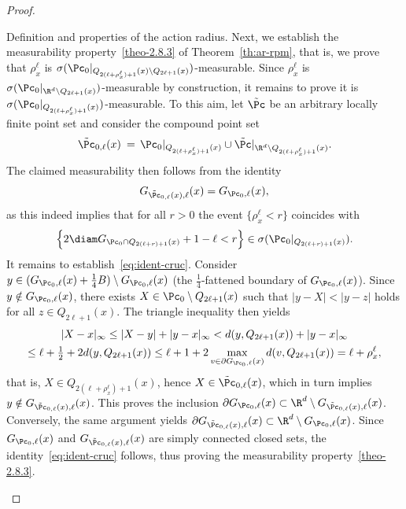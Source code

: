\begin{proof}
\begin{step}{Definition and properties of the action radius.}
Next, we establish the measurability property~\eqref{theo-2.8.3} of Theorem~\ref{th:ar-rpm}, that is, we prove that $\rho_x^\ell$ is $\sigma(\Pc_0|_{Q_{2(\ell+\rho_x^\ell)+1}(x)\setminus Q_{2\ell+1}(x)})$-measurable. Since $\rho_x^\ell$ is $\sigma(\Pc_0|_{\R^d\setminus Q_{2\ell+1}(x)})$-measurable by construction, it remains to prove it is $\sigma(\Pc_0|_{Q_{2(\ell+\rho_x^\ell)+1}(x)})$-measurable. To this aim, let $\tilde \Pc$ be an arbitrary locally finite point set and consider the compound point set
\[
\tilde \Pc_{0,\ell}(x)\:=\,\Pc_0|_{Q_{2(\ell+\rho_x^\ell)+1}(x)} \cup \tilde \Pc|_{\R^d \setminus Q_{2(\ell+\rho_x^\ell)+1}(x)}.
\]
The claimed measurability then follows from the identity
\begin{equation}\label{eq:ident-cruc}
G_{\tilde \Pc_{0,\ell}(x),\ell}(x)=G_{\Pc_0,\ell}(x),
\end{equation}
as this indeed implies that for all $r>0$ the event $\{\rho_x^\ell<r\}$ coincides with
\[
\left\{2\diam G_{\Pc_0\cap Q_{2(\ell+r)+1}(x)}+1-\ell<r\right\}\in\sigma(\Pc_0|_{Q_{2(\ell+r)+1}(x)}).
\]
It remains to establish~\eqref{eq:ident-cruc}. Consider $y\in (G_{\Pc_0,\ell}(x)+\frac14B)\setminus G_{\Pc_0,\ell}(x)$ (the $\frac14$-fattened boundary of $G_{\Pc_0,\ell}(x)$). Since $y \notin G_{\Pc_0,\ell}(x)$, there exists $X \in \Pc_0\setminus Q_{2\ell+1}(x)$ such that $|y-X|<|y-z|$ holds for all $z\in Q_{2\ell+1}(x)$. The triangle inequality then yields
\begin{multline*}
|X-x|_\infty\le |X-y|+|y-x|_\infty<d(y,Q_{2\ell+1}(x))+|y-x|_\infty\\
\le \ell+\tfrac12+2d(y,Q_{2\ell+1}(x))
\le \ell+1+2\max_{v\in \partial G_{\Pc_0,\ell}(x)}d(v,Q_{2\ell+1}(x))=\ell+\rho_x^\ell,
\end{multline*}
that is, $X\in Q_{2(\ell+\rho_x^\ell)+1}(x)$, hence $X\in\tilde\Pc_{0,\ell}(x)$, which in turn implies $y\notin G_{\tilde\Pc_{0,\ell}(x),\ell}(x)$. This proves the inclusion $\partial G_{\Pc_0,\ell}(x)\subset\R^d\setminus G_{\tilde\Pc_{0,\ell}(x),\ell}(x)$. Conversely, the same argument yields $\partial G_{\tilde\Pc_{0,\ell}(x),\ell}(x)\subset\R^d\setminus G_{\Pc_{0},\ell}(x)$. Since $G_{\Pc_{0},\ell}(x)$ and $G_{\tilde\Pc_{0,\ell}(x),\ell}(x)$ are simply connected closed sets, the identity~\eqref{eq:ident-cruc} follows, thus proving the measurability property~\eqref{theo-2.8.3}.
\end{step}


\end{proof}
